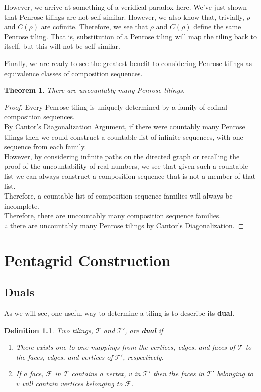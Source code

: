\documentclass[
  oneside,
  11pt, a4paper,
  footinclude=true,
  headinclude=true,
  cleardoublepage=empty
]{scrbook}
\newtheorem{mydef}{Definition}
\newtheorem{mythm}{Theorem}
\begin{document}
However, we arrive at something of a veridical paradox here. We've just shown that Penrose tilings are not self-similar. However, we also know that, trivially, $\rho$ and $C(\rho)$ are cofinite. Therefore, we see that $\rho$ and $C(\rho)$ define the same Penrose tiling. That is, substitution of a Penrose tiling will map the tiling back to itself, but this will not be self-similar. 

Finally, we are ready to see the greatest benefit to considering Penrose tilings as equivalence classes of composition sequences.

\begin{mythm}
There are uncountably many Penrose tilings.
\end{mythm}

\begin{proof}
Every Penrose tiling is uniquely determined by a family of cofinal composition sequences.\\
By Cantor's Diagonalization Argument, if there were countably many Penrose tilings then we could construct a countable list of infinite sequences, with one sequence from each family.\\
However, by considering infinite paths on the directed graph or recalling the proof of the uncountability of real numbers, we see that given such a countable list we can always construct a composition sequence that is not a member of that list.\\
Therefore, a countable list of composition sequence families will always be incomplete.\\
Therefore, there are uncountably many composition sequence families.\\
$\therefore$ there are uncountably many Penrose tilings by Cantor's Diagonalization.
\end{proof}
\chapter{Pentagrid Construction}
\section{Duals}
As we will see, one useful way to determine a tiling is to describe its \textbf{dual}. \cite{Effinger2006}

\begin{mydef}
Two tilings, $\mathcal{T}$ and $\mathcal{T}'$, are \textbf{dual} if 
\begin{enumerate}
\item There exists one-to-one mappings from the vertices, edges, and faces of $\mathcal{T}$  to the faces, edges, and vertices of $\mathcal{T}'$, respectively.
\item If a face, $\mathcal{F}$ in $\mathcal{T}$ contains a vertex, $v$ in $\mathcal{T}'$ then the faces in $\mathcal{T}'$ belonging to $v$ will contain vertices belonging to $\mathcal{F}$. 
\end{enumerate}
\end{mydef}
\end{document}
